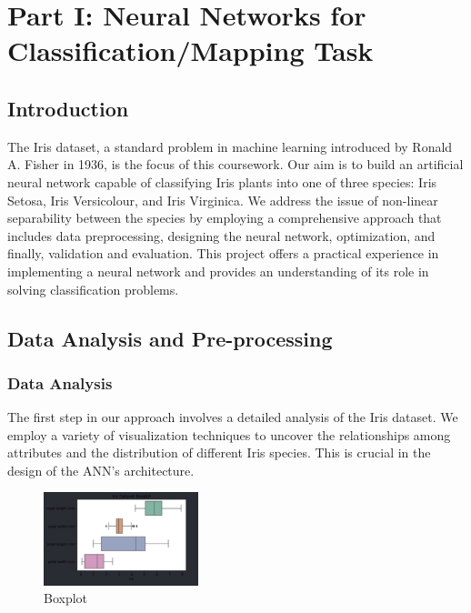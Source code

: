 \documentclass[conference]{inc/IEEEtran}
\begin{document}
\section{Part I: Neural Networks for Classification/Mapping Task}

\subsection{Introduction}

The Iris dataset, a standard problem in machine learning introduced by Ronald A. Fisher in 1936, is the focus of this coursework. Our aim is to build an artificial neural network capable of classifying Iris plants into one of three species: Iris Setosa, Iris Versicolour, and Iris Virginica. We address the issue of non-linear separability between the species by employing a comprehensive approach that includes data preprocessing, designing the neural network, optimization, and finally, validation and evaluation. This project offers a practical experience in implementing a neural network and provides an understanding of its role in solving classification problems.

\subsection{Data Analysis and Pre-processing}

\subsubsection{Data Analysis}

The first step in our approach involves a detailed analysis of the Iris dataset. We employ a variety of visualization techniques to uncover the relationships among attributes and the distribution of different Iris species. This is crucial in the design of the ANN's architecture.

\begin{figure}
  \includegraphics[width=0.4\textwidth]{figures/boxplot.png}
  \caption{Boxplot}
  \label{fig:boat1}
\end{figure}
\end{document}
